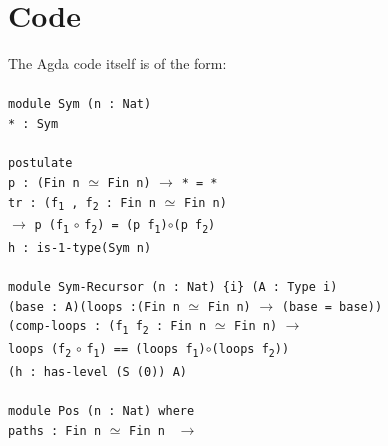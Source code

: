 \documentclass[12pt]{report}
\begin{document}
\section{Code}
The Agda code itself is of the form:\\
\\
\texttt{module Sym (n : Nat)}\\
\-\hspace{1.5cm}\texttt{* : Sym}\\
\\
\-\hspace{1.5cm}\texttt{postulate}\\
\-\hspace{3cm}\texttt{p : (Fin n} $\simeq$ \texttt{Fin n)} $\to$ \texttt{* = *}\\
\-\hspace{3cm}\texttt{tr : (f\textsubscript{1} , f\textsubscript{2} : Fin n} $\simeq$ \texttt{Fin n)}\\
\-\hspace{4.16cm}$\to$ \texttt{p (f\textsubscript{1}} $\circ$ \texttt{f\textsubscript{2}) = (p f\textsubscript{1})}$\circ$\texttt{(p f\textsubscript{2})}\\
\-\hspace{3cm}\texttt{h : is-1-type(Sym n)}\\
\\
\-\hspace{1.5cm}\texttt{module Sym-Recursor (n : Nat) \{i\} (A : Type i)}\\
\-\hspace{3cm}\texttt{(base : A)(loops :(Fin n} $\simeq$ \texttt{Fin n)} $\to$ \texttt{(base = base))}\\
\-\hspace{3cm}\texttt{(comp-loops : (f\textsubscript{1} f\textsubscript{2} : Fin n} $\simeq$ \texttt{Fin n)} $\to$\\
\-\hspace{4.16cm} \texttt{loops (f\textsubscript{2}} $\circ$  \texttt{f\textsubscript{1}) == (loops f\textsubscript{1})}$\circ$\texttt{(loops f\textsubscript{2}))}\\
\-\hspace{3cm}\texttt{(h : has-level (S (0)) A)}\\
\\
\-\hspace{1.5cm}\texttt{module Pos (n : Nat) where}\\
\-\hspace{3.2cm}\texttt{paths : Fin n} $\simeq$  \texttt{Fin n } $\to$\\
\end{document}
